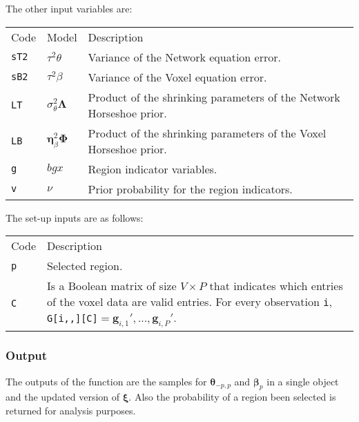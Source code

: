 \documentclass[
]{article}
\begin{document}
The other input variables are:

\begin{longtable}[]{@{}
  >{\raggedleft\arraybackslash}p{}
  >{\centering\arraybackslash}p{}
  >{\raggedright\arraybackslash}p{}@{}}
\toprule\noalign{}
\endhead
\bottomrule\noalign{}
\endlastfoot
Code & Model & Description \\
\texttt{sT2} & \(\tau^2\theta\) & Variance of the Network equation error. \\
\texttt{sB2} & \(\tau^2\beta\) & Variance of the Voxel equation error. \\
\texttt{LT} & \(\sigma^2_\theta {\boldsymbol \Lambda} \) & Product of the shrinking parameters of the Network Horseshoe prior. \\
\texttt{LB} & \( {\boldsymbol \eta} ^2_\beta {\boldsymbol \Phi} \) & Product of the shrinking parameters of the Voxel Horseshoe prior. \\
\texttt{g} & \(bgx\) & Region indicator variables. \\
\texttt{v} & \(\nu\) & Prior probability for the region indicators. \\
\end{longtable}

The set-up inputs are as follows:

\begin{longtable}[]{@{}
  >{\raggedleft\arraybackslash}p{}
  >{\raggedright\arraybackslash}p{}@{}}
\toprule\noalign{}
\endhead
\bottomrule\noalign{}
\endlastfoot
Code & Description \\
\texttt{p} & Selected region. \\
\texttt{C} & Is a Boolean matrix of size \(V \times P\) that indicates which
entries of the voxel data are valid entries. For every observation
\texttt{i}, \texttt{G{[}i,,{]}{[}C{]}}\(= {\boldsymbol g} _{i,1}',\ldots, {\boldsymbol g} _{i,P}'\). \\
\end{longtable}

\subsubsection{Output}\label{output-2}

The outputs of the function are the samples for \( {\boldsymbol \theta} _{-p,p}\) and \( {\boldsymbol \beta} _p\) in
a single object and the updated version of \( {\boldsymbol \xi} \). Also the probability of a
region been selected is returned for analysis purposes.
\end{document}
